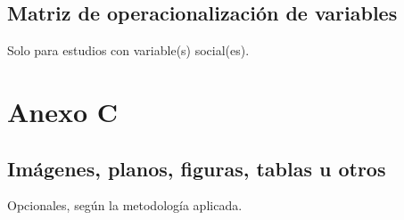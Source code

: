 \documentclass[
]{report}
\begin{document}
\hypertarget{matriz-de-operacionalizaciuxf3n-de-variables}{%
\subsection{Matriz de operacionalización de
variables}\label{matriz-de-operacionalizaciuxf3n-de-variables}}

Solo para estudios con variable(s) social(es).

\hypertarget{anexo-c}{%
\section{Anexo C}\label{anexo-c}}

\hypertarget{imuxe1genes-planos-figuras-tablas-u-otros}{%
\subsection{Imágenes, planos, figuras, tablas u
otros}\label{imuxe1genes-planos-figuras-tablas-u-otros}}

Opcionales, según la metodología aplicada.
\end{document}
